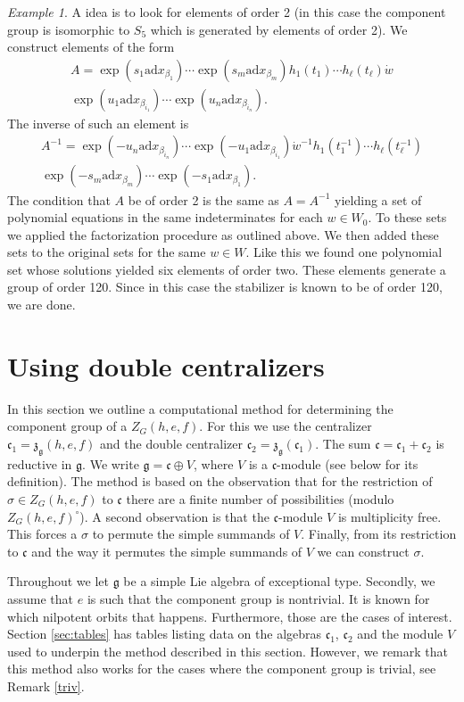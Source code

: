 \documentclass[a4paper,10pt]{amsart}
\newcommand{\mf}{\mathfrak}
\newcommand{\g}{\mf{g}}
\renewcommand{\c}{\mf{c}}
\newcommand{\z}{\mf{z}}
\newcommand{\ad}{\mathrm{ad}}
\numberwithin{equation}{section}
\theoremstyle{remark}
\theoremstyle{remark}
\newtheorem{example}[theorem]{Example}
\begin{document}
\begin{example}
A idea is to look for elements of order 2 (in this case the component group is
isomorphic to $S_5$ which is generated by elements of order 2).
We construct elements of the form
\begin{multline*}
A = \exp(s_1 \ad x_{\beta_1})\cdots \exp(s_m \ad x_{\beta_m})
h_1(t_1)\cdots h_\ell(t_\ell) \dot{w}\\
\exp(u_1 \ad x_{\beta_{i_1}})\cdots \exp(u_n \ad x_{\beta_{i_n}}).
\end{multline*}
The inverse of such an element is
\begin{multline*}
A^{-1} = \exp(-u_n \ad x_{\beta_{i_n}}) \cdots \exp(-u_1 \ad x_{\beta_{i_1}})
\dot{w}^{-1} h_1(t_1^{-1})\cdots h_\ell(t_\ell^{-1})\\
\exp(-s_m \ad x_{\beta_m}) \cdots \exp(-s_1 \ad x_{\beta_1}).
\end{multline*}
The condition that $A$ be of order 2 is the same as $A=A^{-1}$ yielding a set of
polynomial equations in the same indeterminates for each $w\in W_0$.
To these sets we applied the factorization procedure as outlined above. We then
added these sets to the original sets for the same $w\in W$.
Like this we found one polynomial set whose solutions yielded six elements of
order two. These elements generate a group of order 120. Since in this case the
stabilizer is known to be of order 120, we are done. 
\end{example}  

\section{Using double centralizers}\label{sec:double}

In this section we outline a computational method for determining the
component group of a $Z_G(h,e,f)$. For this we use the centralizer
$\c_1=\z_\g(h,e,f)$ and the double centralizer $\c_2=\z_\g(\c_1)$. The sum
$\c=\c_1+\c_2$ is reductive in $\g$. We write $\g = \c\oplus V$, where
$V$ is a $\c$-module (see below for its definition). The method is based on
the observation that for the restriction of $\sigma\in Z_G(h,e,f)$ to
$\c$ there are a finite number of possibilities (modulo $Z_G(h,e,f)^\circ$).
A second observation is that the $\c$-module $V$ is multiplicity free.
This forces a $\sigma$ to permute the simple summands of $V$. Finally, from
its restriction to $\c$ and the way it permutes the simple summands of $V$ we
can construct $\sigma$.

Throughout we let $\g$ be a simple Lie algebra of exceptional
type. Secondly, we assume that $e$ is such that the component group is
nontrivial. It is known for which nilpotent orbits that happens. Furthermore,
those are the cases of interest. Section \ref{sec:tables} has tables
listing data on the algebras $\c_1$, $\c_2$ and the module $V$ used to
underpin the method described in this section. However, we remark that
this method also works for the cases where the component group is trivial,
see Remark \ref{triv}. 
\end{document}
